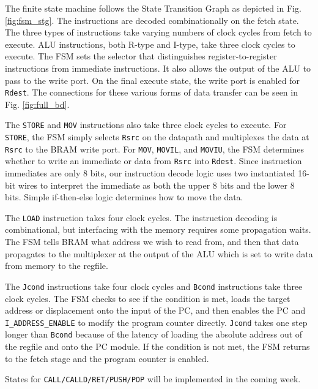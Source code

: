 \documentclass[conference]{IEEEtran}
\begin{document}
The finite state machine follows the State Transition Graph as depicted in Fig. \ref{fig:fsm_stg}. The instructions are decoded combinationally on the fetch state. The three types of instructions take varying numbers of clock cycles from fetch to execute. ALU instructions, both R-type and I-type, take three clock cycles to execute. The FSM sets the selector that distinguishes register-to-register instructions from immediate instructions. It also allows the output of the ALU to pass to the write port. On the final execute state, the write port is enabled for \verb|Rdest|. The connections for these various forms of data transfer can be seen in Fig. \ref{fig:full_bd}.

The \verb|STORE| and \verb|MOV| instructions also take three clock cycles to execute. For \verb|STORE|, the FSM simply selects \verb|Rsrc| on the datapath and multiplexes the data at \verb|Rsrc| to the BRAM write port. For \verb|MOV|, \verb|MOVIL|, and \verb|MOVIU|, the FSM determines whether to write an immediate or data from \verb|Rsrc| into \verb|Rdest|. Since instruction immediates are only 8 bits, our instruction decode logic uses two instantiated 16-bit wires to interpret the immediate as both the upper 8 bits and the lower 8 bits. Simple if-then-else logic determines how to move the data.

The \verb|LOAD| instruction takes four clock cycles. The instruction decoding is combinational, but interfacing with the memory requires some propagation waits. The FSM tells BRAM what address we wish to read from, and then that data propagates to the multiplexer at the output of the ALU which is set to write data from memory to the regfile.

The \verb|Jcond| instructions take four clock cycles and \verb|Bcond| instructions take three clock cycles. The FSM checks to see if the condition is met, loads the target address or displacement onto the input of the PC, and then enables the PC and \verb|I_ADDRESS_ENABLE| to modify the program counter directly. \verb|Jcond| takes one step longer than \verb|Bcond| because of the latency of loading the absolute address out of the regfile and onto the PC module. If the condition is not met, the FSM returns to the fetch stage and the program counter is enabled.

States for \verb|CALL/CALLD/RET/PUSH/POP| will be implemented in the coming week.
\end{document}
